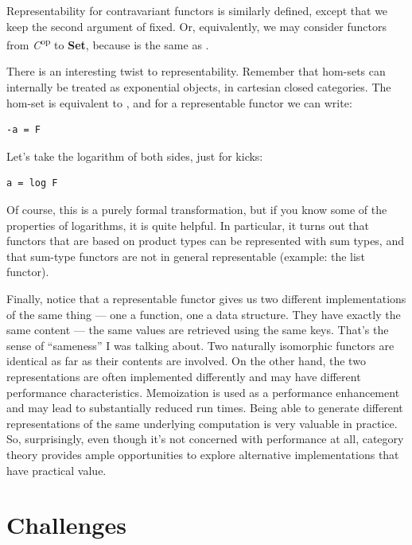 Representability for contravariant functors is similarly defined, except
that we keep the second argument of  fixed. Or,
equivalently, we may consider functors from \emph{C}\textsuperscript{op}
to \textbf{Set}, because  is the same as
.

There is an interesting twist to representability. Remember that
hom-sets can internally be treated as exponential objects, in cartesian
closed categories. The hom-set  is equivalent to
, and for a representable functor  we can write:

\begin{Verbatim}[commandchars=\\\{\}]
-a = F
\end{Verbatim}
Let's take the logarithm of both sides, just for kicks:

\begin{Verbatim}[commandchars=\\\{\}]
a = log F
\end{Verbatim}
Of course, this is a purely formal transformation, but if you know some
of the properties of logarithms, it is quite helpful. In particular, it
turns out that functors that are based on product types can be
represented with sum types, and that sum-type functors are not in
general representable (example: the list functor).

Finally, notice that a representable functor gives us two different
implementations of the same thing --- one a function, one a data
structure. They have exactly the same content --- the same values are
retrieved using the same keys. That's the sense of ``sameness'' I was
talking about. Two naturally isomorphic functors are identical as far as
their contents are involved. On the other hand, the two representations
are often implemented differently and may have different performance
characteristics. Memoization is used as a performance enhancement and
may lead to substantially reduced run times. Being able to generate
different representations of the same underlying computation is very
valuable in practice. So, surprisingly, even though it's not concerned
with performance at all, category theory provides ample opportunities to
explore alternative implementations that have practical value.

\section{Challenges}\label{challenges}

